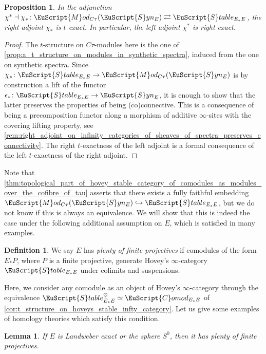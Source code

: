 \documentclass[oneside,a4paper]{amsart}
\newcommand{\euscr}[1]{\EuScript{#1}} %
\newcommand{\stableE}{\euscr{S}table_{E_{*}E}} %
\newcommand{\synspectra}{\euscr{S}yn} %
\newcommand{\Comod}{\euscr{C}omod} %
\newcommand{\ComodE}{\Comod_{E_{*}E}} %
\newcommand{\Mod}{\euscr{M}od} %
\theoremstyle{plain}
\newtheorem{lemma}[thm]{Lemma}
\newtheorem{prop}[thm]{Proposition}
\theoremstyle{definition}
\newtheorem{defin}[thm]{Definition}
\theoremstyle{remark}
\begin{document}
\begin{prop}
In the adjunction $\chi^{*} \dashv \chi_{*} \colon \Mod_{C\tau}(\synspectra_{E}) \rightleftarrows \stableE$, the right adjoint $\chi_{*}$ is $t$-exact. In particular, the left adjoint $\chi^{*}$ is right exact. 
\end{prop}

\begin{proof}
The $t$-structure on $C\tau$-modules here is the one of \cref{prop:a_t_structure_on_modules_in_synthetic_spectra}, induced from the one on synthetic spectra. Since $\chi_{*} \colon \stableE \rightarrow \Mod_{C\tau}(\synspectra_{E})$ is by construction a lift of the functor $\epsilon_{*} \colon \stableE \rightarrow \synspectra_{E}$, it is enough to show that the latter preserves the properties of being (co)connective. This is a consequence of being a precomposition functor along a morphism of additive $\infty$-sites with the covering lifting property, see \cref{rem:right_adjoint_on_infinity_categories_of_sheaves_of_spectra_preserves_connectivity}. The right $t$-exactness of the left adjoint is a formal consequence of the left $t$-exactness of the right adjoint. 
\end{proof}

Note that \cref{thm:topological_part_of_hovey_stable_category_of_comodules_as_modules_over_the_cofibre_of_tau} asserts that there exists a fully faithful embedding $\Mod_{C\tau}(\synspectra_{E}) \hookrightarrow \stableE$, but we do not know if this is always an equivalence. We will show that this is indeed the case under the following additional assumption on $E$, which is satisfied in many examples. 

\begin{defin}
We say $E$ has \emph{plenty of finite projectives} if comodules of the form $E_{*}P$, where $P$ is a finite projective, generate Hovey's $\infty$-category $\stableE$ under colimits and suspensions. 
\end{defin}
Here, we consider any comodule as an object of Hovey's $\infty$-category through the equivalence $\stableE^{\heartsuit} \simeq \ComodE$ of \cref{cor:t_structure_on_hoveys_stable_infty_category}. Let us give some examples of homology theories which satisfy this condition.

\begin{lemma}
\label{lemma:for_landweber_exact_homology_theories_hoveys_stable_infty_cat_is_topological}
If $E$ is Landweber exact or the sphere $S^{0}$, then it has plenty of finite projectives. 
\end{lemma}
\end{document}

